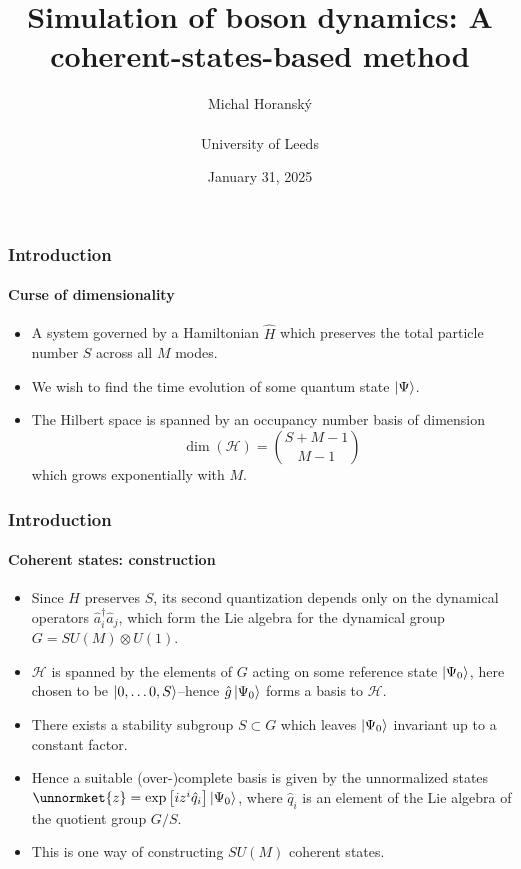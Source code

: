 \documentclass[english]{beamer}
\begin{document}
  \title{Simulation of boson dynamics: A coherent-states-based method}
  \author[Michal Horanský]{Michal Horanský\\\hfill\\University of Leeds}
  \date{January 31, 2025}
  \begin{frame}
    \titlepage
  \end{frame}
  
  
  \begin{frame}
  	\frametitle{Introduction}
  	\framesubtitle{Curse of dimensionality}
  	\begin{itemize}
  		\item A system governed by a Hamiltonian $\hat{H}$ which preserves the total particle number $S$ across all $M$ modes.
  		\item We wish to find the time evolution of some quantum state $\ket{\Psi}$.
  		\item The Hilbert space is spanned by an occupancy number basis of dimension
  		$$\dim(\mathcal{H})={S+M-1\choose M-1}$$
  		which grows exponentially with $M$.
  	\end{itemize}
  \end{frame}
  
  \begin{frame}
  	\frametitle{Introduction}
  	\framesubtitle{Coherent states: construction}
  	\begin{itemize}
  		\item Since $H$ preserves $S$, its second quantization depends only on the dynamical operators $\hat{a}_i^\dag \hat{a}_j$, which form the Lie algebra for the dynamical group $G=SU(M)\otimes U(1)$.
  		\item $\mathcal{H}$ is spanned by the elements of $G$ acting on some reference state $\ket{\Psi_0}$, here chosen to be $\ket{0,\dots 0, S}$--hence $\hat{g}\ket{\Psi_0}$ forms a basis to $\mathcal{H}$.
  		\item There exists a stability subgroup $S \subset G$ which leaves $\ket{\Psi_0}$ invariant up to a constant factor.
  		\item Hence a suitable (over-)complete basis is given by the unnormalized states $\unnormket{z}=\exp\left[iz^i\hat{q}_i\right]\ket{\Psi_0}$, where $\hat{q}_i$ is an element of the Lie algebra of the quotient group $G/S$.
  		\item This is one way of constructing $SU(M)$ coherent states.
  	\end{itemize}
  \end{frame}
  
\end{document}
